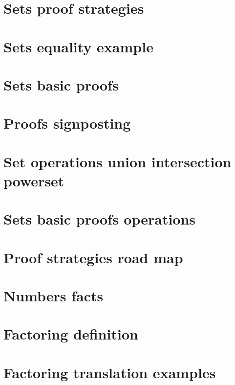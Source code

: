 \section*{Sets proof strategies}

\vfill
\section*{Sets equality example}

\vfill
\section*{Sets basic proofs}

\vfill
\section*{Proofs signposting}

\vfill
\section*{Set operations union intersection powerset}

\vfill
\section*{Sets basic proofs operations}

\vfill
\section*{Proof strategies road map}

\vfill
\section*{Numbers facts}

\vfill
\section*{Factoring definition}

\vfill
\section*{Factoring translation examples}

\vfill
